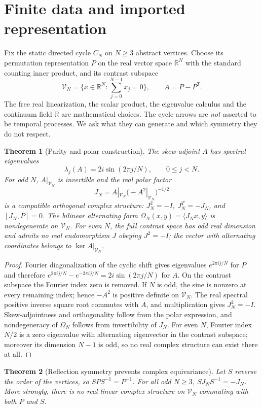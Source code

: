 \documentclass[11pt,letterpaper]{article}
\newtheorem{theorem}{Theorem}\newtheorem{corollary}[theorem]{Corollary}\newtheorem{remark}[theorem]{Remark}
\newcommand{\RR}{\mathbb{R}}\newcommand{\CC}{\mathbb{C}}\newcommand{\VV}{\mathcal{V}}
\begin{document}
\section{Finite data and imported representation}
Fix the static directed cycle $C_N$ on $N\ge3$ abstract vertices. Choose its permutation representation $P$ on the real vector space $\RR^N$ with the standard counting inner product, and its contrast subspace
\[
\VV_N=\{x\in\RR^N: \sum_{j=0}^{N-1}x_j=0\},\qquad A=P-P^T.
\]
The free real linearization, the scalar product, the eigenvalue calculus and the continuum field $\RR$ are mathematical choices. The cycle arrows are \emph{not} asserted to be temporal processes. We ask what they can generate and which symmetry they do not respect.
\begin{theorem}[Parity and polar construction]\label{th:parity}
The skew-adjoint $A$ has spectral eigenvalues
\[
\lambda_j(A)=2i\sin(2\pi j/N),\qquad 0\le j<N.
\]
For odd $N$, $A|_{\VV_N}$ is invertible and the real polar factor
\begin{equation}\label{eq:J}
J_N=A|_{\VV_N}\bigl(-A^2|_{\VV_N}\bigr)^{-1/2}
\end{equation}
is a compatible orthogonal complex structure: $J_N^2=-I$, $J_N^T=-J_N$, and $[J_N,P]=0$. The bilinear alternating form $\Omega_N(x,y)=\langle J_N x,y\rangle$ is nondegenerate on $\VV_N$. For even $N$, the full contrast space has odd real dimension and admits \emph{no} real endomorphism $J$ obeying $J^2=-I$; the vector with alternating coordinates belongs to $\ker A|_{\VV_N}$.
\end{theorem}
\begin{proof}
Fourier diagonalization of the cyclic shift gives eigenvalues $e^{2\pi ij/N}$ for $P$ and therefore $e^{2\pi ij/N}-e^{-2\pi ij/N}=2i\sin(2\pi j/N)$ for $A$. On the contrast subspace the Fourier index zero is removed. If $N$ is odd, the sine is nonzero at every remaining index; hence $-A^2$ is positive definite on $\VV_N$. The real spectral positive inverse square root commutes with $A$, and multiplication gives $J_N^2=-I$. Skew-adjointness and orthogonality follow from the polar expression, and nondegeneracy of $\Omega_N$ follows from invertibility of $J_N$. For even $N$, Fourier index $N/2$ is a zero eigenvalue with alternating eigenvector in the contrast subspace; moreover its dimension $N-1$ is odd, so no real complex structure can exist there at all.
\end{proof}
\begin{theorem}[Reflection symmetry prevents complex equivariance]\label{th:ref}
Let $S$ reverse the order of the vertices, so $SPS^{-1}=P^{-1}$. For all odd $N\ge3$, $S J_N S^{-1}=-J_N$. More strongly, there is no \emph{real linear} complex structure on $\VV_N$ commuting with both $P$ and $S$.
\end{theorem}
\end{document}
